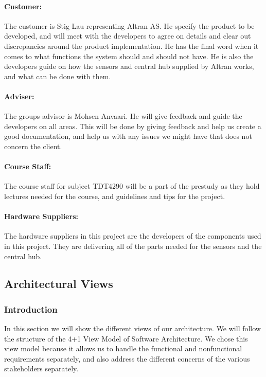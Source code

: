 \documentclass[../document.tex]{subfiles}
\begin{document}
\paragraph{Customer:} The customer is Stig Lau representing Altran AS. He specify the product to be developed, and will meet with the developers to agree on details and clear out discrepancies around the product implementation. He has the final word when it comes to what functions the system should and should not have. He is also the developers guide on how the sensors and central hub supplied by Altran works, and what can be done with them.

\paragraph{Adviser:} The groups advisor is Mohsen Anvaari. He will give feedback and guide the developers on all areas. This will be done by giving feedback and help us create a good documentation, and help us with any issues we might have that does not concern the client.

\paragraph{Course Staff:} The course staff for subject TDT4290 will be a part of the prestudy as they hold lectures needed for the course, and guidelines and tips for the project. 

\paragraph{Hardware Suppliers:} The hardware suppliers in this project are the developers of the components used in this project. They are delivering all of the parts needed for the sensors and the central hub.

\subsection{Architectural Views}
\subsubsection{Introduction}
In this section we will show the different views of our architecture. We will follow the structure of the 4+1 View Model of Software Architecture. We chose this view model because it allows us to handle the functional and nonfunctional requirements separately, and also address the different concerns of the various stakeholders separately. 
\end{document}
